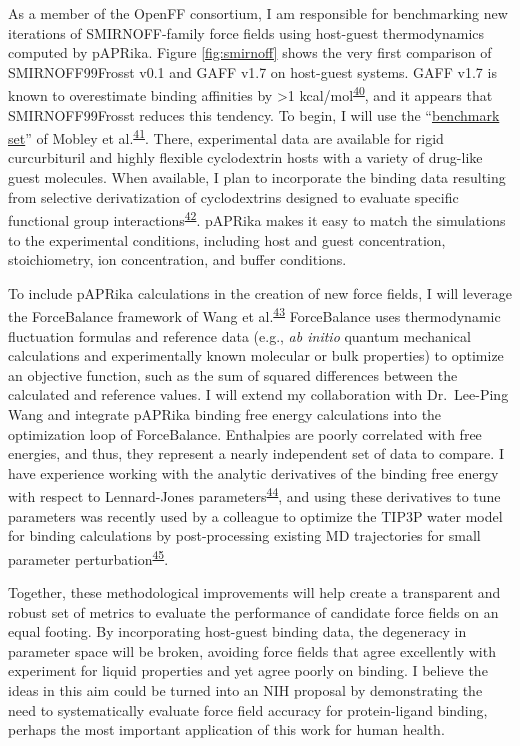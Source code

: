 \documentclass[11pt,notitlepage]{article}
\begin{document}
As a member of the OpenFF consortium, I am responsible for benchmarking
new iterations of SMIRNOFF-family force fields using host-guest
thermodynamics computed by pAPRika. Figure \ref{fig:smirnoff} shows the
very first comparison of SMIRNOFF99Frosst v0.1 and GAFF v1.7 on
host-guest systems. GAFF v1.7 is known to overestimate binding
affinities by \textgreater{}1
kcal/mol\textsuperscript{\protect\hyperlink{ref-HVgz5rZq}{40}}, and it
appears that SMIRNOFF99Frosst reduces this tendency. To begin, I will
use the ``\href{https://escholarship.org/uc/item/9p37m6bq}{benchmark
set}'' of Mobley et
al.\textsuperscript{\protect\hyperlink{ref-12BD3oHp4}{41}}. There,
experimental data are available for rigid curcurbituril and highly
flexible cyclodextrin hosts with a variety of drug-like guest molecules.
When available, I plan to incorporate the binding data resulting from
selective derivatization of cyclodextrins designed to evaluate specific
functional group
interactions\textsuperscript{\protect\hyperlink{ref-13gqBX78S}{42}}.
pAPRika makes it easy to match the simulations to the experimental
conditions, including host and guest concentration, stoichiometry, ion
concentration, and buffer conditions.

To include pAPRika calculations in the creation of new force fields, I
will leverage the ForceBalance framework of Wang et
al.\textsuperscript{\protect\hyperlink{ref-JFWYe0Pp}{43}} ForceBalance
uses thermodynamic fluctuation formulas and reference data (e.g.,
\emph{ab initio} quantum mechanical calculations and experimentally
known molecular or bulk properties) to optimize an objective function,
such as the sum of squared differences between the calculated and
reference values. I will extend my collaboration with Dr.~Lee-Ping Wang
and integrate pAPRika binding free energy calculations into the
optimization loop of ForceBalance. Enthalpies are poorly correlated with
free energies, and thus, they represent a nearly independent set of data
to compare. I have experience working with the analytic derivatives of
the binding free energy with respect to Lennard-Jones
parameters\textsuperscript{\protect\hyperlink{ref-xRauI5mb}{44}}, and
using these derivatives to tune parameters was recently used by a
colleague to optimize the TIP3P water model for binding calculations by
post-processing existing MD trajectories for small parameter
perturbation\textsuperscript{\protect\hyperlink{ref-NeqIQDLp}{45}}.

Together, these methodological improvements will help create a
transparent and robust set of metrics to evaluate the performance of
candidate force fields on an equal footing. By incorporating host-guest
binding data, the degeneracy in parameter space will be broken, avoiding
force fields that agree excellently with experiment for liquid
properties and yet agree poorly on binding. I believe the ideas in this
aim could be turned into an NIH proposal by demonstrating the need to
systematically evaluate force field accuracy for protein-ligand binding,
perhaps the most important application of this work for human health.
\end{document}
